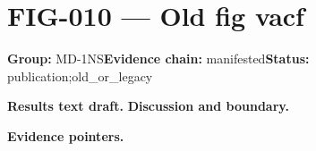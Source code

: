 \clearpage
\section{FIG-010 --- Old fig vacf}
\label{figpage:fig-010}
\textbf{Group:} MD-1NS\quad \textbf{Evidence chain:} manifested\quad \textbf{Status:} publication;old\_or\_legacy

\textbf{Results text draft.} 
\textbf{Discussion and boundary.} 


\textbf{Evidence pointers.}



\vfill
